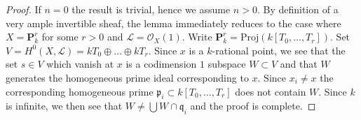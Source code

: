 \documentclass[10pt,a4paper]{amsart}
\theoremstyle{plain}
\theoremstyle{definition}
\theoremstyle{remark}
\numberwithin{equation}{subsection}
\begin{document}
\begin{proof}
If $n = 0$ the result is trivial, hence we assume $n > 0$.
By definition of a very ample invertible sheaf, the lemma immediately
reduces to the case where $X = \mathbf{P}^r_k$ for some $r > 0$
and $\mathcal{L} = \mathcal{O}_X(1)$. Write
$\mathbf{P}^r_k = \text{Proj}(k[T_0, \ldots, T_r])$.
Set $V = H^0(X, \mathcal{L}) = kT_0 \oplus \ldots \oplus kT_r$.
Since $x$ is a $k$-rational point, we see that the set
$s \in V$ which vanish at $x$ is a codimension $1$ subspace
$W \subset V$ and that $W$ generates the homogeneous prime
ideal corresponding to $x$. Since $x_i \not = x$ the corresponding
homogeneous prime $\mathfrak p_i \subset k[T_0, \ldots, T_r]$ does
not contain $W$. Since $k$ is infinite, we then see that
$W \not = \bigcup W \cap \mathfrak q_i$ and the proof is complete.
\end{proof}
\end{document}
